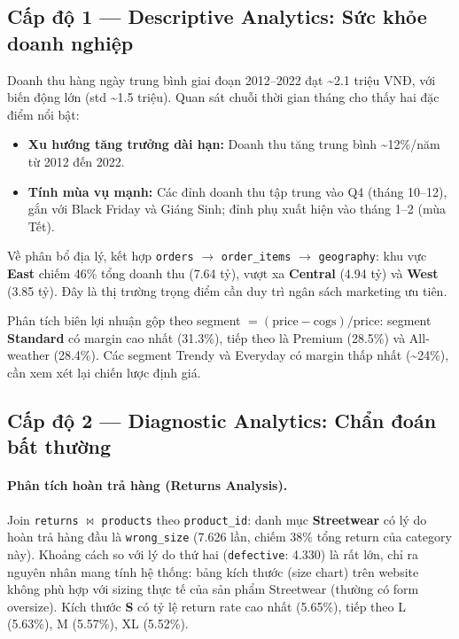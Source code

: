 \documentclass{article}
\begin{document}
\subsection{Cấp độ 1 — Descriptive Analytics: Sức khỏe doanh nghiệp}

Doanh thu hàng ngày trung bình giai đoạn 2012--2022 đạt \textasciitilde 2.1 triệu VNĐ, với biến động lớn (std \textasciitilde 1.5 triệu). Quan sát chuỗi thời gian tháng cho thấy hai đặc điểm nổi bật:
\begin{itemize}[noitemsep]
    \item \textbf{Xu hướng tăng trưởng dài hạn:} Doanh thu tăng trung bình \textasciitilde 12\%/năm từ 2012 đến 2022.
    \item \textbf{Tính mùa vụ mạnh:} Các đỉnh doanh thu tập trung vào Q4 (tháng 10--12), gắn với Black Friday và Giáng Sinh; đỉnh phụ xuất hiện vào tháng 1--2 (mùa Tết).
\end{itemize}

Về phân bổ địa lý, kết hợp \texttt{orders} $\to$ \texttt{order\_items} $\to$ \texttt{geography}: khu vực \textbf{East} chiếm 46\% tổng doanh thu (7.64 tỷ), vượt xa \textbf{Central} (4.94 tỷ) và \textbf{West} (3.85 tỷ). Đây là thị trường trọng điểm cần duy trì ngân sách marketing ưu tiên.

Phân tích biên lợi nhuận gộp theo segment $= (\text{price} - \text{cogs}) / \text{price}$: segment \textbf{Standard} có margin cao nhất (31.3\%), tiếp theo là Premium (28.5\%) và All-weather (28.4\%). Các segment Trendy và Everyday có margin thấp nhất (\textasciitilde 24\%), cần xem xét lại chiến lược định giá.

\subsection{Cấp độ 2 — Diagnostic Analytics: Chẩn đoán bất thường}

\paragraph{Phân tích hoàn trả hàng (Returns Analysis).}
Join \texttt{returns} $\bowtie$ \texttt{products} theo \texttt{product\_id}: danh mục \textbf{Streetwear} có lý do hoàn trả hàng đầu là \texttt{wrong\_size} (7.626 lần, chiếm 38\% tổng return của category này). Khoảng cách so với lý do thứ hai (\texttt{defective}: 4.330) là rất lớn, chỉ ra nguyên nhân mang tính hệ thống: bảng kích thước (size chart) trên website không phù hợp với sizing thực tế của sản phẩm Streetwear (thường có form oversize). Kích thước \textbf{S} có tỷ lệ return rate cao nhất (5.65\%), tiếp theo L (5.63\%), M (5.57\%), XL (5.52\%).
\end{document}
